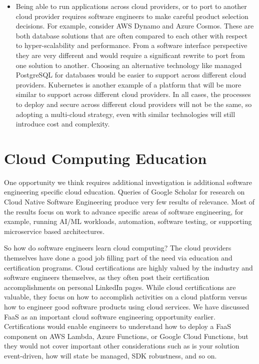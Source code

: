 \documentclass[conference]{IEEEtran}
\begin{document}
\begin{itemize}
	\item Being able to run applications across cloud providers, or to port to another cloud provider requires software engineers to make careful product selection decisions.  For example, consider AWS Dynamo and Azure Cosmos.  These are both database solutions that are often compared to each other with respect to hyper-scalability and performance.  From a software interface perspective they are very different and would require a significant rewrite to port from one solution to another.  Choosing an alternative technology like managed PostgreSQL for databases would be easier to support across different cloud providers.  Kubernetes is another example of a platform that will be more similar to support across different cloud providers.  In all cases, the processes to deploy and secure across different cloud providers will not be the same, so adopting a multi-cloud strategy, even with similar technologies will still introduce cost and complexity.
\end{itemize}  

\section{Cloud Computing Education}
One opportunity we think requires additional investigation is additional software engineering specific cloud education.  Queries of Google Scholar\cite{GoogleScolar} for research on Cloud Native Software Engineering produce very few results of relevance.  Most of the results focus on work to advance specific areas of software engineering, for example, running AI/ML workloads, automation, software testing, or supporting microservice based architectures.  

So how do software engineers learn cloud computing?  The cloud providers themselves have done a good job filling part of the need via education and certification programs.  Cloud certifications are highly valued by the industry and software engineers themselves, as they often post their certification accomplishments on personal LinkedIn pages. While cloud certifications are valuable, they focus on how to accomplish activities on a cloud platform versus how to engineer good software products using cloud services.  We have discussed FaaS as an important cloud software engineering opportunity earlier. Certifications would enable engineers to understand how to deploy a FaaS component on AWS Lambda, Azure Functions, or Google Cloud Functions, but they would not cover important other considerations such as is your solution event-driven, how will state be managed, SDK robustness, and so on.
\end{document}
